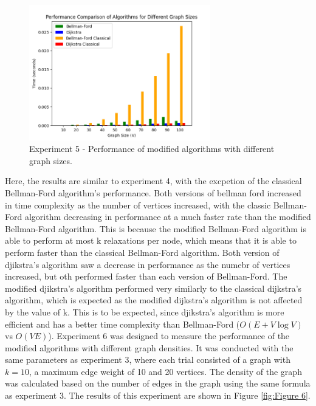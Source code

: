 \documentclass{article}
\begin{document}
\begin{onehalfspace}
\begin{figure}[H] 
    \centering
    \includegraphics[width=0.7\textwidth]{Figures/Performance_sizes.png} 
    \caption{\footnotesize Experiment 5 - Performance of modified algorithms with different graph sizes.}
    \label{fig:Figure 5} 
\end{figure}

Here, the results are similar to experiment 4, with the excpetion of the classical Bellman-Ford algorithm's performance.
Both versions of bellman ford increased in time complexity as the number of vertices increased, with the classic Bellman-Ford algorithm decreasing in performance at a much faster rate
than the modified Bellman-Ford algorithm. This is because the modified Bellman-Ford algorithm is able to perform at most k relaxations per node, which means that it is able to perform faster than the classical Bellman-Ford algorithm.
Both version of djikstra's algorithm saw a decrease in performance as the numebr of vertices increased, but oth performed faster than each 
version of Bellman-Ford. The modified djikstra's algorithm performed very similarly to the classical dijkstra's algorithm, which is expected as the modified dijkstra's algorithm is not affected by the value of k.
This is to be expected, since djikstra's algorithm is more efficient and has a better time complexity than Bellman-Ford ($O(E + V \log V)$ vs $O(VE)$).
\smallskip
\newline
\indent
Experiment 6 was designed to measure the performance of the modified algorithms with different graph densities. 
It was conducted with the same parameters as experiment 3, where each trial consisted of a graph with $k=10$, a maximum edge weight of 10 and 20 vertices. The density of the graph was calculated based on the number of edges in the graph using the same formula as experiment 3.
The results of this experiment are shown in Figure \ref{fig:Figure 6}.


\end{onehalfspace}
\end{document}
